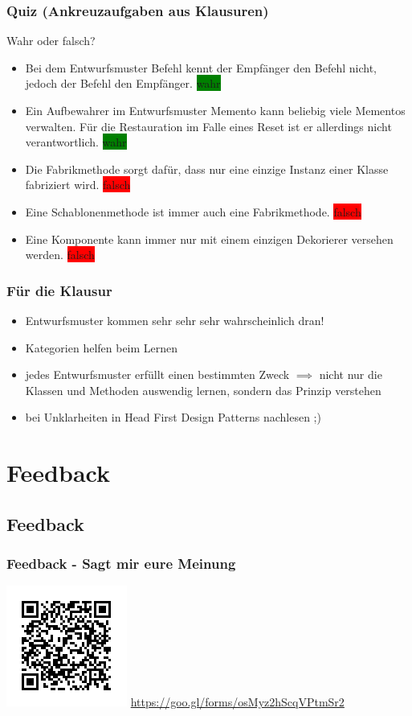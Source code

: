 \documentclass[18pt]{beamer}
\begin{document}
	\begin{frame}
		\frametitle{Quiz (Ankreuzaufgaben aus Klausuren)}
		Wahr oder falsch?
		\begin{itemize}
			\item Bei dem Entwurfsmuster Befehl kennt der Empfänger den Befehl nicht, jedoch der Befehl den Empfänger. \pause \colorbox{green}{wahr} \pause
			\item Ein Aufbewahrer im Entwurfsmuster Memento kann beliebig viele Mementos verwalten. Für die Restauration im Falle eines Reset ist er allerdings nicht verantwortlich. \pause \colorbox{green}{wahr} \pause
			\item Die Fabrikmethode sorgt dafür, dass nur eine einzige Instanz einer Klasse fabriziert wird. \pause \colorbox{red}{falsch} \pause 
			\item Eine Schablonenmethode ist immer auch eine Fabrikmethode. \pause \colorbox{red}{falsch} \pause
			\item Eine Komponente kann immer nur mit einem einzigen Dekorierer versehen werden. \pause \colorbox{red}{falsch}
		\end{itemize}
	\end{frame}
	
	
	\begin{frame}
		\frametitle{Für die Klausur}
		\begin{itemize}
			\item Entwurfsmuster kommen sehr sehr sehr wahrscheinlich dran! \pause 
			\item Kategorien helfen beim Lernen \pause
			\item jedes Entwurfsmuster erfüllt einen bestimmten Zweck 
			\linebreak $\implies$ nicht nur die Klassen und Methoden auswendig lernen, sondern das Prinzip verstehen \pause
			\item bei Unklarheiten in Head First Design Patterns nachlesen ;)
		\end{itemize}
	\end{frame}

\section{Feedback}
	\subsection{Feedback}
	\begin{frame}
		\frametitle{Feedback - Sagt mir eure Meinung}
		\includegraphics[scale=1.0]{./pics/tut4/qr-feedback.png}
		\linebreak
		\centering \large \url{https://goo.gl/forms/osMyz2hScqVPtmSr2}
\end{frame}
	
\end{document}
